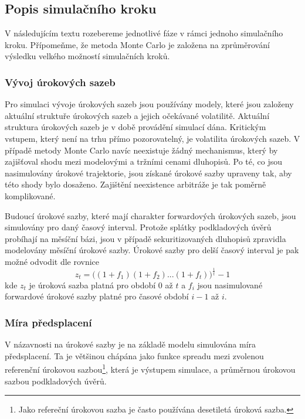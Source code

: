\documentclass[a4paper]{book}
\begin{document}
\subsection{Popis simulačního kroku}

V následujícím textu rozebereme jednotlivé fáze v rámci jednoho simulačního kroku. Přípomeňme, že metoda Monte Carlo je založena na zprůměrování výsledku velkého možností simulačních kroků.

\subsubsection{Vývoj úrokových sazeb}

Pro simulaci vývoje úrokových sazeb jsou používány modely, které jsou založeny aktuální struktuře úrokových sazeb a jejich očekávané volatilitě. Aktuální struktura úrokových sazeb je v době provádění simulací dána. Kritickým vstupem, který není na trhu přímo pozorovatelný, je volatilita úrokových sazeb. V případě metody Monte Carlo navíc neexistuje žádný mechanismus, který by zajišťoval shodu mezi modelovými a tržními cenami dluhopisů. Po té, co jsou nasimulovány úrokové trajektorie, jsou získané úrokové sazby upraveny tak, aby této shody bylo dosaženo. Zajištění neexistence arbitráže je tak poměrně komplikované.

Budoucí úrokové sazby, které mají charakter forwardových úrokových sazeb, jsou simulovány pro daný časový interval. Protože splátky podkladových úvěrů probíhají na měsíční bázi, jsou v případě sekuritizovaných dluhopisů zpravidla modelovány měsíční úrokové sazby. Úrokové sazby pro delší časový interval je pak možné odvodit dle rovnice
\begin{equation*}
z_t = \Big((1 + f_1)(1 + f_2)...(1 + f_t)\Big)^{\frac{1}{t}} - 1
\end{equation*}
kde $z_t$ je úroková sazba platná pro období 0 až $t$ a $f_i$ jsou nasimulované forwardové úrokové sazby platné pro časové období $i-1$ až $i$.

\subsubsection{Míra předsplacení}

V názavnosti na úrokové sazby je na základě modelu simulována míra předsplacení. Ta je většinou chápána jako funkce spreadu mezi zvolenou referenční úrokovou sazbou\footnote{Jako refereční úrokovou sazba je často používána desetiletá úroková sazba.}, která je výstupem simulace, a průměrnou úrokovou sazbou podkladových úvěrů.
\end{document}
